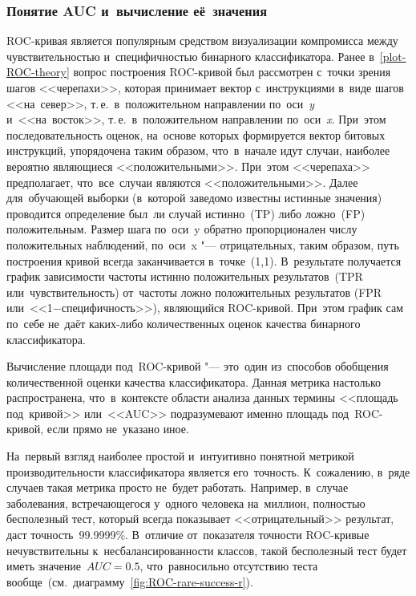 \documentclass[]{scrreprt}
\begin{document}
\subsubsection{Понятие AUC и~вычисление её~значения}\label{calculate-AUC-theory}
ROC-кривая является популярным средством визуализации компромисса между чувствительностью и~специфичностью бинарного классификатора. Ранее в~\ref{plot-ROC-theory} вопрос построения ROC-кривой был рассмотрен с~точки зрения шагов <<черепахи>>, которая принимает вектор с~инструкциями в~виде шагов <<на~север>>, т.\,е.~в~положительном направлении по~оси~\textit{y} и~<<на~восток>>, т.\,е.~в~положительном направлении по~оси~\textit{x}. При~этом последовательность оценок, на~основе которых формируется вектор битовых инструкций, упорядочена таким образом, что~в~начале идут случаи, наиболее вероятно являющиеся <<положительными>>. При~этом <<черепаха>> предполагает, что~все~случаи являются <<положительными>>. Далее для~обучающей выборки (в~которой заведомо известны истинные значения) проводится определение был~ли случай истинно~(TP) либо ложно~(FP) положительным. Размер шага по~оси~y обратно пропорционален числу положительных наблюдений, по~оси~x "--- отрицательных, таким образом, путь построения кривой всегда заканчивается в~точке~(1,1). В~результате получается график зависимости частоты истинно положительных результатов~(TPR или~чувствительность) от~частоты ложно положительных результатов (FPR или~<<1$-$специфичность>>), являющийся ROC-кривой. При~этом график сам по~себе не~даёт каких-либо количественных оценок качества бинарного классификатора.

Вычисление площади под~ROC-кривой "--- это~один из~способов обобщения количественной оценки качества классификатора. Данная метрика настолько распространена, что~в~контексте области анализа данных термины <<площадь под~кривой>> или~<<AUC>> подразумевают именно площадь под~ROC-кривой, если прямо не~указано иное.

На~первый взгляд наиболее простой и~интуитивно понятной метрикой производительности классификатора является его~точность. К~сожалению, в~ряде случаев такая метрика просто не~будет работать. Например, в~случае заболевания, встречающегося у~одного человека на~миллион, полностью бесполезный тест, который всегда показывает <<отрицательный>> результат, даст точность~99.9999\%. В~отличие от~показателя точности ROC-кривые нечувствительны к~несбалансированности классов, такой бесполезный тест будет иметь значение~$AUC=0.5$, что~равносильно отсутствию теста вообще~(см.~диаграмму~\ref{fig:ROC-rare-success-r}).
\end{document}
